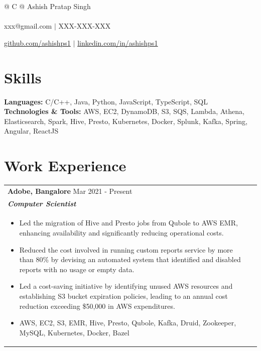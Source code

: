 \documentclass[a4paper,8pt]{article}
\begin{document}
\pagestyle{empty} 


\begin{tabularx}{\linewidth}{@{} C @{}}
\color[HTML]{1C033C} \Huge{Ashish Pratap Singh} \\[6pt]
\\
\textcolor[HTML]{371e77}{{{{\faEnvelope} xxx@gmail.com}} $|$}
\textcolor[HTML]{371e77}{{{\faMobile} XXX-XXX-XXX}}

\textcolor[HTML]{371e77}{\underline{{\raisebox{-0.05\height}{\faGithub} github.com/ashishps1}} $|$}
\textcolor[HTML]{371e77}{\underline{{\raisebox{-0.05\height}{\faLinkedin} linkedin.com/in/ashishps1}}}
\end{tabularx}

\section{Skills}
\color[HTML]{1C033C}\textbf{Languages:} C/C++, Java, Python, JavaScript, TypeScript, SQL\\[3pt]
\color[HTML]{1C033C}\textbf{Technologies \& Tools:} AWS, EC2, DynamoDB, S3, SQS, Lambda, Athena, Elasticsearch, Spark, Hive, Presto, Kubernetes, Docker, Splunk, Kafka, Spring, Angular, ReactJS\\[3pt]

\section{Work Experience}
\begin{tabularx}{\linewidth}{ @{}l r@{} }
\textbf{{Adobe, Bangalore}} \hfill \color[HTML]{371e77} Mar 2021 - Present \\[4pt]
\color[HTML]{371e77}\textbf{\textit{Computer Scientist}}\ \hfill \color[HTML]{4B28A4} \\[5pt]
\begin{minipage}[t]{\linewidth}
    \begin{itemize}[nosep,after=\strut, leftmargin=2em, itemsep=2pt]
        \item Led the migration of Hive and Presto jobs from Qubole to AWS EMR, enhancing availability and significantly reducing operational costs.
        \item Reduced the cost involved in running custom reports service by more than 80\% by devising an automated system that identified and disabled reports with no usage or empty data.
        \item Led a cost-saving initiative by identifying unused AWS resources and establishing S3 bucket expiration policies, leading to an annual cost reduction exceeding \$50,000 in AWS expenditures.
        \item AWS, EC2, S3, EMR, Hive, Presto, Qubole, Kafka, Druid, Zookeeper, MySQL, Kubernetes, Docker, Bazel
    \end{itemize}
\end{minipage}
\end{tabularx}
\end{document}
